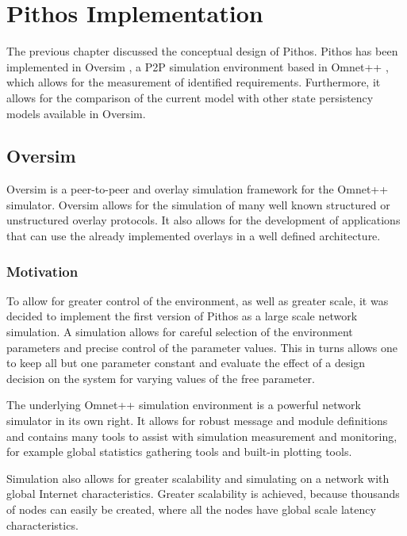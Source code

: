 \chapter{Pithos Implementation}
\label{chp:IMPLEMENTATION}

The previous chapter discussed the conceptual design of Pithos. Pithos has been implemented in Oversim \cite{OverSim_2007}, a P2P simulation environment based in Omnet++ \cite{omnetpp}, which allows for the measurement of identified requirements. Furthermore, it allows for the comparison of the current model with other state persistency models available in Oversim.

\section{Oversim}

Oversim is a peer-to-peer and overlay simulation framework for the Omnet++ simulator. Oversim allows for the simulation of many well known structured or unstructured overlay protocols. It also allows for the development of applications that can use the already implemented overlays in a well defined architecture.

\subsection{Motivation}

To allow for greater control of the environment, as well as greater scale, it was decided to implement the first version of Pithos as a large scale network simulation. A simulation allows for careful selection of the environment parameters and precise control of the parameter values. This in turns allows one to keep all but one parameter constant and evaluate the effect of a design decision on the system for varying values of the free parameter.

The underlying Omnet++ simulation environment is a powerful network simulator in its own right. It allows for robust message and module definitions and contains many tools to assist with simulation measurement and monitoring, for example global statistics gathering tools and built-in plotting tools.

Simulation also allows for greater scalability and simulating on a network with global Internet characteristics. Greater scalability is achieved, because thousands of nodes can easily be created, where all the nodes have global scale latency characteristics.

